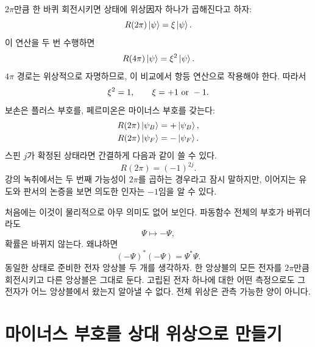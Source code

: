 \(2\pi\)만큼 한 바퀴 회전시키면 상태에 위상因자 하나가 곱해진다고 하자:
\begin{equation}
R(2\pi)\left\lvert\psi\right\rangle=\xi\left\lvert\psi\right\rangle.
\end{equation}
이 연산을 두 번 수행하면
\begin{equation}
R(4\pi)\left\lvert\psi\right\rangle=\xi^2\left\lvert\psi\right\rangle.
\end{equation}
\(4\pi\) 경로는 위상적으로 자명하므로, 이 비교에서 항등 연산으로 작용해야 한다. 따라서
\begin{equation}
\xi^2=1,
\qquad
\xi=+1\ \hbox{or}\ -1.
\end{equation}
보손은 플러스 부호를, 페르미온은 마이너스 부호를 갖는다:
\begin{align}
R(2\pi)\left\lvert\psi_B\right\rangle&=+\left\lvert\psi_B\right\rangle,\\
R(2\pi)\left\lvert\psi_F\right\rangle&=-\left\lvert\psi_F\right\rangle.
\end{align}
스핀 \(j\)가 확정된 상태라면 간결하게 다음과 같이 쓸 수 있다.
\begin{equation}
R(2\pi)=(-1)^{2j}.
\end{equation}
강의 녹취에서는 두 번째 가능성이 \(2\pi\)를 곱하는 경우라고 잠시 말하지만, 이어지는 유도와 판서의 논증을 보면 의도한 인자는 \(-1\)임을 알 수 있다.

처음에는 이것이 물리적으로 아무 의미도 없어 보인다. 파동함수 전체의 부호가 바뀌더라도
\begin{equation}
\Psi\longmapsto-\Psi,
\end{equation}
확률은 바뀌지 않는다. 왜냐하면
\begin{equation}
(-\Psi)^*(-\Psi)=\Psi^*\Psi.
\end{equation}
동일한 상태로 준비한 전자 앙상블 두 개를 생각하자. 한 앙상블의 모든 전자를 \(2\pi\)만큼 회전시키고 다른 앙상블은 그대로 둔다. 고립된 전자 하나에 대한 어떤 측정으로도 그 전자가 어느 앙상블에서 왔는지 알아낼 수 없다. 전체 위상은 관측 가능한 양이 아니다.

\section{마이너스 부호를 상대 위상으로 만들기}

